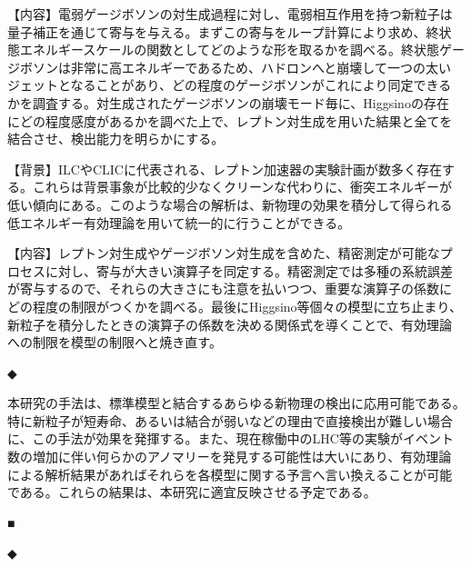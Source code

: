 \documentclass[11pt,a4paper,twoside,dvipdfmx]{jarticle}		%
\newcommand{\研究課題名}{粒子加速器を用いた電弱相互作用を持つ新物理の探索}
\newcommand{\研究機関名}{東京大学}
\newcommand{\申請者氏名}{千草颯}
\newcommand{\研究代表者氏名}{\申請者氏名}
\newcommand{\研究期間の最終元号年度}{34}	%
\begin{document}
{【内容】電弱ゲージボソンの対生成過程に対し、電弱相互作用を持つ新粒子は
量子補正を通じて寄与を与える。まずこの寄与をループ計算により求め、終状
態エネルギースケールの関数としてどのような形を取るかを調べる。終状態ゲー
ジボソンは非常に高エネルギーであるため、ハドロンへと崩壊して一つの太い
ジェットとなることがあり、どの程度のゲージボソンがこれにより同定できる
かを調査する。対生成されたゲージボソンの崩壊モード毎に、Higgsinoの存在
にどの程度感度があるかを調べた上で、レプトン対生成を用いた結果と全てを
結合させ、検出能力を明らかにする。

\vspace*{1mm}


\vspace*{1mm}

【背景】ILCやCLICに代表される、レプトン加速器の実験計画が数多く存在す
る。これらは背景事象が比較的少なくクリーンな代わりに、衝突エネルギーが
低い傾向にある。このような場合の解析は、新物理の効果を積分して得られる
低エネルギー有効理論を用いて統一的に行うことができる。

【内容】レプトン対生成やゲージボソン対生成を含めた、精密測定が可能なプ
ロセスに対し、寄与が大きい演算子を同定する。精密測定では多種の系統誤差
が寄与するので、それらの大きさにも注意を払いつつ、重要な演算子の係数に
どの程度の制限がつくかを調べる。最後にHiggsino等個々の模型に立ち止まり、
新粒子を積分したときの演算子の係数を決める関係式を導くことで、有効理論
への制限を模型の制限へと焼き直す。

\vspace*{1mm}

◆ 

\vspace*{1mm}

本研究の手法は、標準模型と結合するあらゆる新物理の検出に応用可能である。
特に新粒子が短寿命、あるいは結合が弱いなどの理由で直接検出が難しい場合
に、この手法が効果を発揮する。また、現在稼働中のLHC等の実験がイベント
数の増加に伴い何らかのアノマリーを発見する可能性は大いにあり、有効理論
による解析結果があればそれらを各模型に関する予言へ言い換えることが可能
である。これらの結果は、本研究に適宜反映させる予定である。

\vspace*{1mm}

■ 

\vspace*{1mm}

◆ 

}
\end{document}
